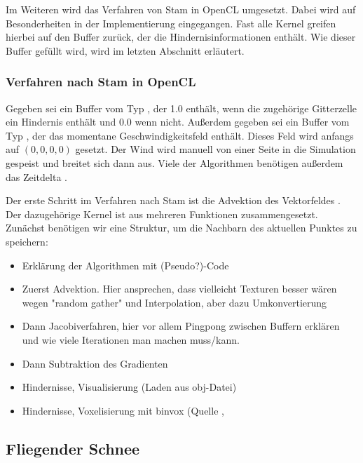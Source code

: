 Im Weiteren wird das Verfahren von Stam in OpenCL umgesetzt. Dabei wird auf
Besonderheiten in der Implementierung eingegangen. Fast alle Kernel greifen
hierbei auf den Buffer zurück, der die Hindernisinformationen enthält. Wie
dieser Buffer gefüllt wird, wird im letzten Abschnitt erläutert.

\subsubsection{Verfahren nach Stam in OpenCL}

Gegeben sei ein Buffer  vom Typ
, der 1.0 enthält, wenn die zugehörige Gitterzelle ein
Hindernis enthält und 0.0 wenn nicht. Außerdem gegeben sei ein Buffer
 vom Typ , der das
momentane Geschwindigkeitsfeld enthält. Dieses Feld wird anfangs auf $(0,0,0,0)$
gesetzt. Der Wind wird manuell von einer Seite in die Simulation gespeist und
breitet sich dann aus. Viele der Algorithmen benötigen außerdem das Zeitdelta
.

Der erste Schritt im Verfahren nach Stam ist die Advektion des Vektorfeldes
. Der dazugehörige Kernel ist aus mehreren
Funktionen zusammengesetzt. Zunächst benötigen wir eine Struktur, um die
Nachbarn des aktuellen Punktes zu speichern:





\begin{itemize}
\item Erklärung der Algorithmen mit (Pseudo?)-Code
\item Zuerst Advektion. Hier ansprechen, dass vielleicht Texturen besser wären
wegen "random gather" und Interpolation, aber dazu Umkonvertierung
\item Dann Jacobiverfahren, hier vor allem Pingpong zwischen Buffern erklären
und wie viele Iterationen man machen muss/kann.
\item Dann Subtraktion des Gradienten
\item Hindernisse, Visualisierung (Laden aus obj-Datei)
\item Hindernisse, Voxelisierung mit binvox (Quelle \cite{Nooruddin2003}, \cite{binvox2012}
\end{itemize}

\subsection{Fliegender Schnee}

